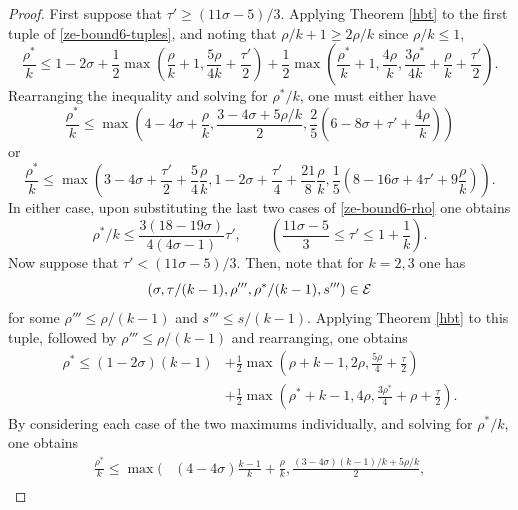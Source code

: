 \begin{proof}
First suppose that $\tau' \ge (11\sigma - 5)/3$. Applying Theorem \ref{hbt} to the first tuple of \eqref{ze-bound6-tuples}, and noting that $\rho/k + 1 \ge 2\rho/k$ since $\rho/k \le 1$,
\[
\frac{\rho^*}{k} \le 1-2\sigma + \frac{1}{2}\max(\frac{\rho}{k}+1, \frac{5\rho}{4k} + \frac{\tau'}{2}) + \frac{1}{2}\max(\frac{\rho^*}{k}+1, \frac{4\rho}{k}, \frac{3\rho^*}{4k} +\frac{\rho}{k}+\frac{\tau'}{2}).
\]
Rearranging the inequality and solving for $\rho^*/k$, one must either have
\begin{equation}\label{ze-bound6-rhostar-bound-case01}
\frac{\rho^*}{k} \le \max(4 - 4\sigma + \frac{\rho}{k}, \frac{3 - 4\sigma + 5\rho/k}{2}, \frac{2}{5}(6 - 8\sigma + \tau' + \frac{4\rho}{k}))
\end{equation}
or
\begin{equation}\label{ze-bound6-rhostar-bound-case02}
\frac{\rho^*}{k} \le \max(3 - 4\sigma + \frac{\tau'}{2} + \frac{5}{4}\frac{\rho}{k}, 1 - 2\sigma + \frac{\tau'}{4} + \frac{21}{8}\frac{\rho}{k}, \frac{1}{5}(8 - 16\sigma + 4\tau' + 9\frac{\rho}{k})).
\end{equation}
In either case, upon substituting the last two cases of \eqref{ze-bound6-rho} one obtains
\begin{equation}\label{ze-bound6-rhostar-bound-case1}
\rho^*/k \le \frac{3(18-19\sigma)}{4(4\sigma-1)}\tau',\qquad (\frac{11\sigma - 5}{3} \le \tau'\le 1 + \frac{1}{k}).
\end{equation}
Now suppose that $\tau' < (11\sigma - 5)/3$. Then, note that for $k = 2, 3$ one has
\[
(\sigma, \tau/(k-1), \rho''', \rho^*/(k-1), s''') \in \mathcal{E}
\]
for some $\rho''' \le \rho /(k-1)$ and $s''' \le s/(k-1)$. Applying Theorem \ref{hbt} to this tuple, followed by $\rho''' \le \rho/(k - 1)$ and rearranging, one obtains
\begin{equation}\label{ze-bound6-rhostar-bound}
\begin{split}
\rho^* \le (1-2\sigma)(k - 1) &+ \frac{1}{2}\max(\rho+k - 1, 2\rho, \frac{5\rho}{4} + \frac{\tau}{2}) \\
&+ \frac{1}{2}\max(\rho^*+k - 1, 4\rho, \frac{3\rho^*}{4} + \rho+\frac{\tau}{2}).
\end{split}
\end{equation}
By considering each case of the two maximums individually, and solving for $\rho^*/k$, one obtains
\begin{equation}\label{ze-bound6-rhostar-bound3}
\begin{split}
\frac{\rho^*}{k} \le \max\bigg(&(4 - 4\sigma)\frac{k - 1}{k} + \frac{\rho}{k}, \frac{(3 - 4\sigma)(k - 1)/k + 5\rho/k}{2}, \\

\end{split}
\end{equation}
\end{proof}
